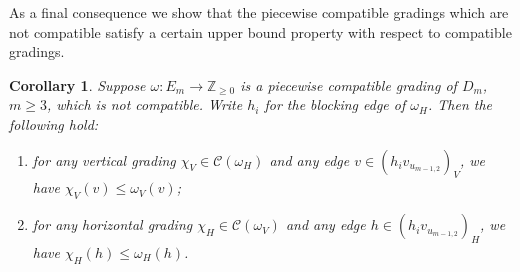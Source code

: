 \documentclass[10pt]{amsart}
\newtheorem{corollary}[theorem]{Corollary}
\theoremstyle{definition}
\newcommand{\cC}{\mathcal{C}}
\newcommand{\ZZ}{\mathbb{Z}}
\begin{document}
As a final consequence we show that the piecewise compatible gradings which are not compatible satisfy a certain upper bound property with respect to compatible gradings.
\begin{corollary}
 \label{cor:maximality}
 Suppose $\omega:E_m\to\ZZ_{\ge0}$ is a piecewise compatible grading of $D_m$, $m\ge3$, which is not compatible.
 Write $h_i$ for the blocking edge of $\omega_H$.
 Then the following hold:
 \begin{enumerate}[label=(\alph*)]
 \item\label{coro3.24_1} for any vertical grading $\chi_V\in\cC(\omega_H)$ and any edge $v\in(h_iv_{u_{m-1,2}})_V$, we have $\chi_V(v)\le\omega_V(v)$;
 \item\label{coro3.24_2} for any horizontal grading $\chi_H\in\cC(\omega_V)$ and any edge $h\in(h_iv_{u_{m-1,2}})_H$, we have $\chi_H(h)\le\omega_H(h)$.
 \end{enumerate}
\end{corollary}
\end{document}
